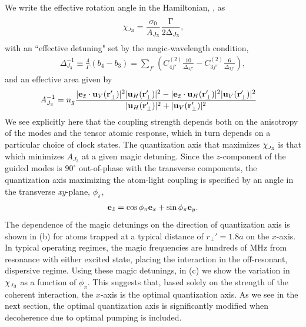 \documentclass[preprint, aps,pra,onecolumn]{revtex4-1} %
\newcommand{\qaxis}{\mathbf{e}_{\tilde{z}}}
\newcommand{\chieff}{\chi_{\raisebox{-.1pt}{\tiny $J_3$}}}
\begin{document}
We write the effective rotation angle in the Hamiltonian, , as
	\begin{align} \label{Eq::chieff}
		\chieff = \frac{\sigma_0}{A_{J_3}} \frac{\Gamma}{ 2 \Delta_{J_3}},
	\end{align}
with an ``effective detuning" set by the magic-wavelength condition,
	\begin{align} \label{Eq::SqueezingEffectiveDetuning}
		 \Delta_{J_3}^{-1} \equiv \frac{4}{\Gamma} (b_4 - b_3) =   \sum_{f'}  \left( C^{(2)}_{4f'}\frac{10}{\Delta_{4f'}} -  C^{(2)}_{3f'}\frac{6}{ \Delta_{3f'} } \right),
	\end{align}
and an effective area given by
	\begin{align} \label{Eq::SqueezingModeArea}
		A_{J_3}^{-1} & = n_g \frac{ |\mathbf{e}_{\tilde{z}} \cdot \mathbf{u}_V(\mathbf{r}'_\perp)|^2 |\mathbf{u}_H(\mathbf{r}'_\perp)|^2 - |\mathbf{e}_{\tilde{z}} \cdot \mathbf{u}_H(\mathbf{r}'_\perp) |^2 |\mathbf{u}_V(\mathbf{r}'_\perp)|^2 }{ |\mathbf{u}_H(\mathbf{r}'_\perp)|^2 + |\mathbf{u}_V(\mathbf{r}'_\perp)|^2 } 
	\end{align}	
{\color{blue} We see explicitly here that the coupling strength depends both on the anisotropy of the modes and the tensor atomic response, which in turn depends on a particular choice of clock states.}  The quantization axis that maximizes $\chieff$ is that which minimizes $A_{J_3}$ at a given magic detuning.  
Since the $z$-component of the guided modes is $90^\circ$ out-of-phase with the transverse components, the quantization axis maximizing the atom-light coupling is specified by an angle in the transverse \emph{xy}-plane, $\phi_\pi$,
	\begin{align} \label{Eq::QuantizationAxis}
		\qaxis = \cos \phi_\pi \mbf{e}_x + \sin \phi_\pi \mbf{e}_y.
	\end{align}
The dependence of the magic detunings on the direction of quantization axis is shown in (b) for atoms trapped at a typical distance of $r_\perp'=1.8a$ on the $x$-axis.   
In typical operating regimes, the magic frequencies are hundreds of MHz from resonance with either excited state, placing the interaction in the off-resonant, dispersive regime.  
Using these magic detunings, in (c) we show the variation in $\chieff$ as a function of $\phi_\pi$.  
This suggests that, based solely on the strength of the coherent interaction, the $x$-axis is the optimal quantization axis. 
As we see in the next section, the optimal quantization axis is significantly modified when decoherence due to optimal pumping is included.
\end{document}
